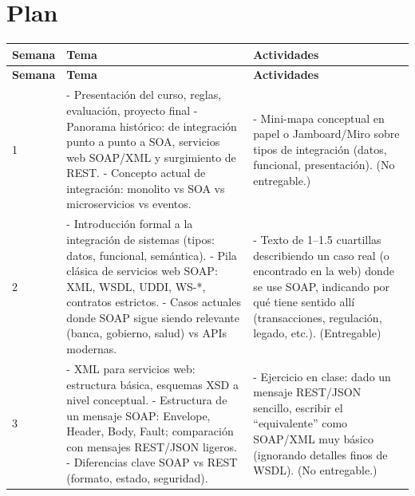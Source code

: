 \documentclass[12pt]{article}
\begin{document}
	\vspace{1em}
	
	\section*{Plan}
	
	\setlength{\extrarowheight}{2pt}
	
	\begin{longtable}{|>{\centering\arraybackslash}p{1.5cm}|p{6.7cm}|p{6.7cm}|}
		\hline
		\textbf{Semana} & \textbf{Tema} & \textbf{Actividades} \\
		\hline
		\endfirsthead
		\hline
		\textbf{Semana} & \textbf{Tema} & \textbf{Actividades} \\
		\hline
		\endhead
		
		1 &
		- Presentación del curso, reglas, evaluación, proyecto final 
		\newline- Panorama histórico: de integración punto a punto a SOA, servicios web SOAP/XML y surgimiento de REST.
		\newline- Concepto actual de integración: monolito vs SOA vs microservicios vs eventos.
		&
		- Mini-mapa conceptual en papel o Jamboard/Miro sobre tipos de integración (datos, funcional, presentación). (No entregable.) \\
		\hline
		
		2 &
		- Introducción formal a la integración de sistemas (tipos: datos, funcional, semántica).
		\newline- Pila clásica de servicios web SOAP: XML, WSDL, UDDI, WS-*, contratos estrictos.
		\newline- Casos actuales donde SOAP sigue siendo relevante (banca, gobierno, salud) vs APIs modernas.
		&
		- Texto de 1–1.5 cuartillas describiendo un caso real (o encontrado en la web) donde se use SOAP, indicando por qué tiene sentido allí (transacciones, regulación, legado, etc.). (Entregable) \\
		\hline
		
		3 &
		- XML para servicios web: estructura básica, esquemas XSD a nivel conceptual.
		\newline- Estructura de un mensaje SOAP: Envelope, Header, Body, Fault; comparación con mensajes REST/JSON ligeros.
		\newline- Diferencias clave SOAP vs REST (formato, estado, seguridad). &
		- Ejercicio en clase: dado un mensaje REST/JSON sencillo, escribir el “equivalente” como SOAP/XML muy básico (ignorando detalles finos de WSDL). (No entregable.) \\
		\hline
		

\end{longtable}
\end{document}
